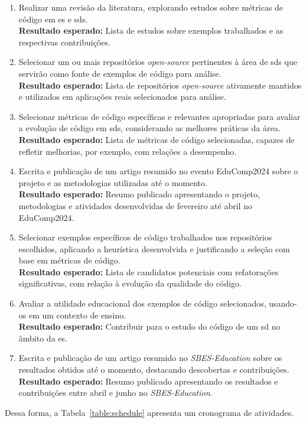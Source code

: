 \begin{enumerate}
    \item Realizar uma revisão da literatura, explorando estudos sobre métricas de código em \gls{es} e \gls{sds}.
    \\\textbf{Resultado esperado:} Lista de estudos sobre exemplos trabalhados e as respectivas contribuições.

    \item Selecionar um ou mais repositórios \textit{open-source} pertinentes à área de \gls{sds} que servirão como fonte de exemplos de código para análise.
    \\\textbf{Resultado esperado:} Lista de repositórios \textit{open-source} ativamente mantidos e utilizados em aplicações reais selecionados para análise.

    \item Selecionar métricas de código específicas e relevantes apropriadas para avaliar a evolução de código em \gls{sds}, considerando as melhores práticas da área.
    \\\textbf{Resultado esperado:} Lista de métricas de código selecionadas, capazes de refletir melhorias, por exemplo, com relações a desempenho.

    \item Escrita e publicação de um artigo resumido no evento EduComp2024 sobre o projeto e as metodologias utilizadas até o momento.
    \\\textbf{Resultado esperado:} Resumo publicado apresentando o projeto, metodologias e atividades desenvolvidas de fevereiro até abril no EduComp2024.

    \item Selecionar exemplos específicos de código trabalhados nos repositórios escolhidos, aplicando a heurística desenvolvida e justificando a seleção com base em métricas de código.
    \\\textbf{Resultado esperado:} Lista de candidatos potenciais com refatorações significativas, com relação à evolução da qualidade do código.

    \item Avaliar a utilidade educacional dos exemplos de código selecionados, usando-os em um contexto de ensino.
    \\\textbf{Resultado esperado:} Contribuir para o estudo do código de um \gls{sd} no âmbito da \gls{es}.

    \item Escrita e publicação de um artigo resumido no \textit{SBES-Education} sobre os resultados obtidos até o momento, destacando descobertas e contribuições.
    \\\textbf{Resultado esperado:} Resumo publicado apresentando os resultados e contribuições entre abril e junho no \textit{SBES-Education}.
\end{enumerate}

Dessa forma, a Tabela~\ref{table:schedule} apresenta um cronograma de atividades.